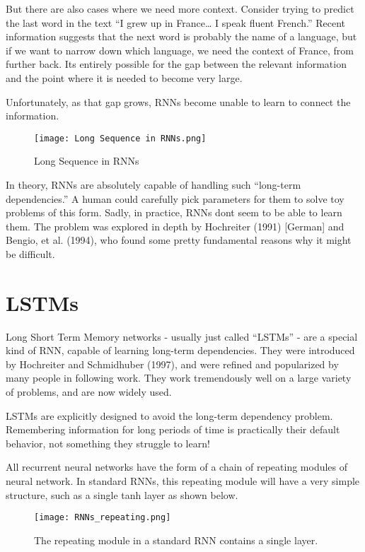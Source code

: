 But there are also cases where we need more context. Consider trying to predict the last word in the text “I grew up in France… I speak fluent French.” Recent information suggests that the next word is probably the name of a language, but if we want to narrow down which language, we need the context of France, from further back. It\textquotesingle s entirely possible for the gap between the relevant information and the point where it is needed to become very large.

Unfortunately, as that gap grows, RNNs become unable to learn to connect the information.

\begin{figure}[H]
    \centering
    \texttt{[image: Long Sequence in RNNs.png]}
    \caption{Long Sequence in RNNs}
    \label{fig:Short Sequence in RNNs}
\end{figure}

In theory, RNNs are absolutely capable of handling such “long-term dependencies.” A human could carefully pick parameters for them to solve toy problems of this form. Sadly, in practice, RNNs don\textquotesingle t seem to be able to learn them. The problem was explored in depth by Hochreiter (1991) [German] and Bengio, et al. (1994), who found some pretty fundamental reasons why it might be difficult.


\section{LSTMs}
Long Short Term Memory networks - usually just called “LSTMs” - are a special kind of RNN, capable of learning long-term dependencies. They were introduced by Hochreiter and Schmidhuber (1997), and were refined and popularized by many people in following work. They work tremendously well on a large variety of problems, and are now widely used.

LSTMs are explicitly designed to avoid the long-term dependency problem. Remembering information for long periods of time is practically their default behavior, not something they struggle to learn!

All recurrent neural networks have the form of a chain of repeating modules of neural network. In standard RNNs, this repeating module will have a very simple structure, such as a single tanh layer as shown below.

\begin{figure}[H]
    \centering
    \texttt{[image: RNNs\_repeating.png]}
    \caption{The repeating module in a standard RNN contains a single layer.}
    \label{fig:RNNs_repeating}
\end{figure}


